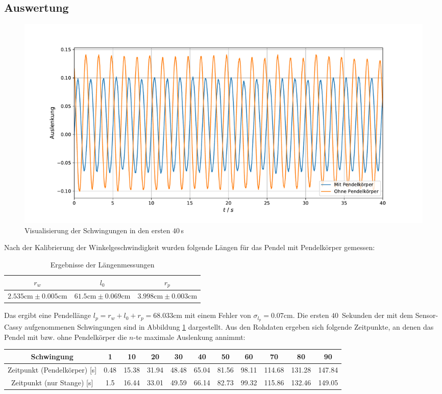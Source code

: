 \subsection{Auswertung}
\begin{figure}[H]
	\centering
	\includegraphics[width = \textwidth]{plots/rohdaten.pdf}
	\caption{Visualisierung der Schwingungen in den ersten $40\,$s}\label{plot:rohdaten}
\end{figure}

Nach der Kalibrierung der Winkelgeschwindigkeit wurden folgende Längen für das Pendel mit Pendelkörper gemessen:

\begin{table}[H]
\centering
\begin{tabular}{c|c|c}
$r_w$ & $l_0$ & $r_p$ \\
\hline
$2.535\text{cm} \pm 0.005\text{cm}$ & $61.5\text{cm}\pm 0.069\text{cm}$ & $3.998\text{cm} \pm 0.003\text{cm}$
\end{tabular}
\caption{Ergebnisse der Längenmessungen}
\end{table}

Das ergibt eine Pendellänge $l_p = r_w + l_0 + r_p = 68.033 \text{cm}$ mit einem Fehler von $\sigma_{l_p} = 0.07 \text{cm}$. Die ersten $40\,$ Sekunden der mit dem Sensor-Cassy aufgenommenen Schwingungen sind in Abbildung \ref{plot:rohdaten} dargestellt. Aus den Rohdaten ergeben sich folgende Zeitpunkte, an denen das Pendel mit bzw. ohne Pendelkörper die $n$-te maximale Auslenkung annimmt:

\begin{table}[H]
\centering

\begin{adjustbox}{width=\textwidth}
\begin{tabular}{c|cccccccccc}
Schwingung & 1 & 10 & 20 & 30 & 40 & 50 & 60 & 70 & 80 & 90 \\
\hline
Zeitpunkt (Pendelkörper) [s] & 0.48 & 15.38 & 31.94 & 48.48 & 65.04 & 81.56 & 98.11 & 114.68 & 131.28 & 147.84 \\
Zeitpunkt (nur Stange) [s] & 1.5 & 16.44 & 33.01 & 49.59 & 66.14 & 82.73 & 99.32 & 115.86 & 132.46 & 149.05
\end{tabular}
\end{adjustbox}
\end{table}

